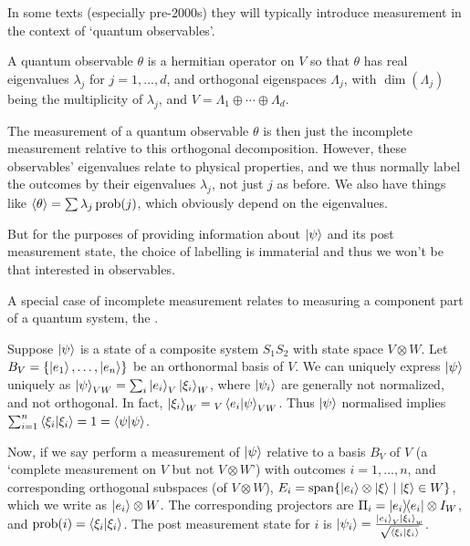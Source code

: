 \documentclass[a4paper]{article}
\begin{document}
In some texts (especially pre-2000s) they will typically introduce measurement in the context of `quantum observables'.

\begin{definition}[Observable]
	A quantum observable $\theta$ is a hermitian operator on $V$ so that $\theta$ has real eigenvalues $\lambda_j$ for $j = 1, \dots, d$, and orthogonal eigenspaces $\Lambda_j$, with $\operatorname{dim}(\Lambda_j)$ being the multiplicity of $\lambda_j$, and $V = \Lambda_1 \oplus \cdots \oplus \Lambda_d$. 
\end{definition}

The measurement of a quantum observable $\theta$ is then just the incomplete measurement relative to this orthogonal decomposition.
However, these observables' eigenvalues relate to physical properties, and we thus normally label the outcomes by their eigenvalues $\lambda_j$, not just $j$ as before. We also have things like $\expval{\theta} = \sum \lambda_j \operatorname{prob}(j)$, which obviously depend on the eigenvalues. 

But for the purposes of providing information about $\ket{\psi}$ and its post measurement state, the choice of labelling is immaterial and thus we won't be that interested in observables.

A special case of incomplete measurement relates to measuring a component part of a quantum system, the .

Suppose $\ket{\psi}$ is a state of a composite system $S_1 S_2$ with state space $V \otimes W$. Let $B_V = \{\ket{e_1}, \dots, \ket{e_n}\}$ be an orthonormal basis of $V$. We can uniquely express $\ket{\psi}$ uniquely as $\ket{\psi}_{VW} = \sum_i \ket{e_i}_V \ket{\xi_i}_W$, where $\ket{\psi_i}$ are generally not normalized, and not orthogonal. In fact, $\ket{\xi_i}_W = {}_V\ip{e_i}{\psi}_{VW}$.
Thus $\ket{\psi}$ normalised implies $\sum_{i = 1}^n \ip{\xi_i}{\xi_i} = 1 = \ip{\psi}{\psi}$.

Now, if we say perform a measurement of $\ket{\psi}$ relative to a basis $B_V$ of $V$ (a `complete measurement on $V$ but not $V \otimes W$') with outcomes $i = 1, \dots, n$, and corresponding orthogonal subspaces (of $V \otimes W$), $E_i = \operatorname{span} \{\ket{e_i} \otimes \ket{\xi} \mid \ket{\xi} \in W\}$, which we write as $\ket{e_i} \otimes W$. The corresponding projectors are $\Pi_i = \op{e_i}{e_i}\otimes I_W $, and $\operatorname{prob}(i) = \ip{\xi_i}{\xi_i}$. The post measurement state for $i$ is $\ket{\psi_i} = \frac{\ket{e_i}_V \ket{\xi_i}_w}{\sqrt{\ip{\xi_i}{\xi_i}}}$.
\end{document}
